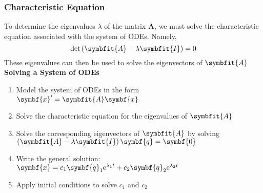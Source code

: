 \documentclass{article}
\begin{document}
\subsubsection{Characteristic Equation}
To determine the eigenvalues $\lambda$ of the matrix $\symbf{A}$, we must solve the characteristic equation
associated with the system of ODEs. Namely,
\begin{equation*}
    \det{\left( \symbfit{A} - \lambda\symbfit{I} \right)} = 0
\end{equation*}
These eigenvalues can then be used to solve the eigenvectors of $\symbfit{A}$
\textbf{Solving a System of ODEs}
\begin{enumerate}
    \item Model the system of ODEs in the form $\symbf{x}' = \symbfit{A} \symbf{x}$
    \item Solve the characteristic equation for the eigenvalues of $\symbfit{A}$
    \item Solve the corresponding eigenvectors of $\symbfit{A}$ by solving $\left( \symbfit{A} - \lambda\symbfit{I} \right) \symbf{q} = \symbf{0}$
    \item Write the general solution: $\symbf{x} = c_1\symbf{q}_1\e^{\lambda_1 t} + c_2\symbf{q}_2\e^{\lambda_2 t}$
    \item Apply initial conditions to solve $c_1$ and $c_2$
\end{enumerate}
\end{document}
